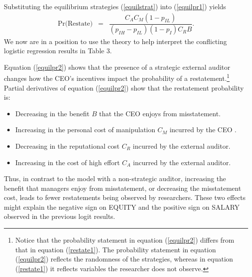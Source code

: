 Substituting the equilibrium strategies (\ref{equilstrat}) into (\ref{equilpr1}) yields
\begin{equation} \label{equilpr2}
\begin{array}{lcl}
\mbox{Pr(Restate)}& = &  \dfrac{C_AC_M(1-p_{IL})}{(p_{IH}-p_{IL})(1-p_I)C_RB}.
\end{array}\end{equation}
We now are in a position to use the theory to help interpret the conflicting logistic regression results
in Table 3. 

Equation (\ref{equilpr2}) shows that the presence of a strategic external auditor
changes how the CEO's incentives impact the probability of a restatement.\footnote{Notice that
the probability statement in equation  (\ref{equilpr2})  differs from that in equation (\ref{restate1}).
The probability statement in equation  (\ref{equilpr2}) reflects the randomness of the strategies, whereas in equation (\ref{restate1}) it reflects variables the researcher does not observe.} 
Partial derivatives of equation (\ref{equilpr2}) show that the restatement probability is:
\begin{itemize}
\item Decreasing in the benefit $B$ that the CEO enjoys from misstatement.
\item Increasing in the personal cost of manipulation $C_M$ incurred by the CEO .
\item Decreasing in the reputational cost $C_R$ incurred by the external auditor.
\item Increasing in the cost of high effort $C_A$ incurred by the external auditor.
\end{itemize}

Thus, in contrast to the model with a non-strategic auditor, increasing the benefit that managers enjoy from misstatement, or decreasing the misstatement cost, leads to fewer restatements being observed by researchers.
These two effects might explain the negative sign on EQUITY and the positive sign on SALARY observed in the previous logit results. 

